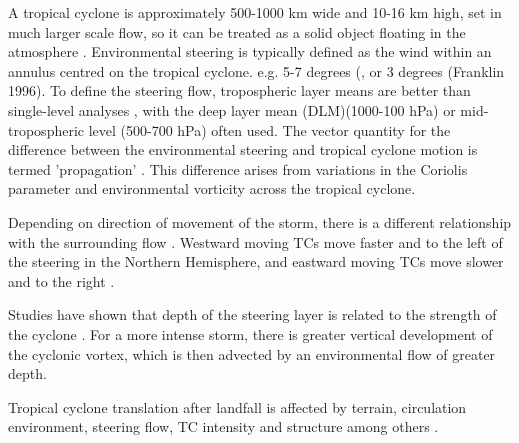 A tropical cyclone is approximately 500-1000 km wide and 10-16 km high, set in much larger scale flow, so it can be treated as a solid object floating in the atmosphere \citep{chan2005physics}. Environmental steering is typically defined as the wind within an annulus centred on the tropical cyclone. e.g. 5-7 degrees (\citep{chan1982tropical}, \citep{chan1985identification} or 3 degrees (Franklin 1996). To define the steering flow, tropospheric layer means are better than single-level analyses \citep{velden1991basic}, with the deep layer mean (DLM)(1000-100 hPa) or mid-tropospheric level (500-700 hPa) often used. The vector quantity for the difference between the environmental steering and tropical cyclone motion is termed 'propagation' \citep{carr1990observational}. This difference arises from variations in the Coriolis parameter and environmental vorticity across the tropical cyclone. 

Depending on direction of movement of the storm, there is a different relationship with the surrounding flow \citep{chan1985identification}. Westward moving TCs move faster and to the left of the steering in the Northern Hemisphere, and eastward moving TCs move slower and to the right \citep{carr1990observational}.


Studies have shown that depth of the steering layer is related to the strength of the cyclone \citep{velden1991basic}. For a more intense storm, there is greater vertical development of the cyclonic vortex, which is then advected by an environmental flow of greater depth. 

Tropical cyclone translation after landfall is affected by terrain, circulation environment, steering flow, TC intensity and structure among others \citep{xiao2013analysis}.



